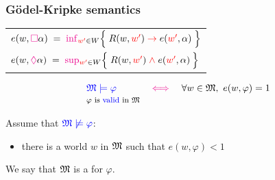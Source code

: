 
\begin{frame}
  \frametitle{G\"odel-Kripke semantics}


  
  \begin{tcolorbox}[colframe=blue!75!black,width=\linewidth]
    \hspace{-2ex}\begin{tabular}{p{72ex}}
      $e(w,{\color{magenta} \Box} \alpha) \;=\; {\color{magenta} \inf}_{{\color{red} w'}\in W}\Big\{\;R(w,{\color{red} w'})\;{\color{red} \to}\; e({\color{red} w'},\alpha)\;\Big\}$
\\[4ex]
      $e(w,{\color{magenta} \lozenge} \alpha)\;=\; {\color{magenta} \sup}_{{\color{red} w'}\in W}\Big\{\;R(w,{\color{red} w'})\;{\color{red} \land}\; e({\color{red} w'},\alpha)\:\Big\}$
    \end{tabular}
  \end{tcolorbox}
  

  \SP
  \begin{bbluebox}{}%
    \[
      \begin{array}{lcl}
   \tb{\M\models \varphi}  &\;\tm\IFF\;& \forall w\in \M,\ e(w,\varphi)=1
\\
\text{\medfont $\varphi$ is \tb{valid} in $\M$}
      \end{array}
      \]
  \end{bbluebox}

  
  Assume that $\color{blue} \mathfrak{M}\not\models \varphi$:

  \smallskip
  \begin{itemize}
  \item there is a world $w$  in $\mathfrak{M}$ such that $e(w,\varphi) < 1$
  \end{itemize}


  \MSK
  
  We say that $\mathfrak{M}$ is a  for $\varphi$.

  \VFILL

\end{frame}






